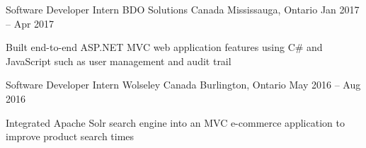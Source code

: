 \begin{cventries}
  \cventry
    {Software Developer Intern} %
    {BDO Solutions Canada} %
    {Mississauga, Ontario} %
    {Jan 2017 -- Apr 2017} %
    {
      \begin{cvitems} %
        \item {Built end-to-end ASP.NET MVC web application features using C\# and JavaScript such as user management and audit trail}
      \end{cvitems}
    }

  \cventry
    {Software Developer Intern} %
    {Wolseley Canada} %
    {Burlington, Ontario} %
    {May 2016 -- Aug 2016} %
    {
      \begin{cvitems} %
        \item {Integrated Apache Solr search engine into an MVC e-commerce application to improve product search times}
      \end{cvitems}
    }

\end{cventries}
